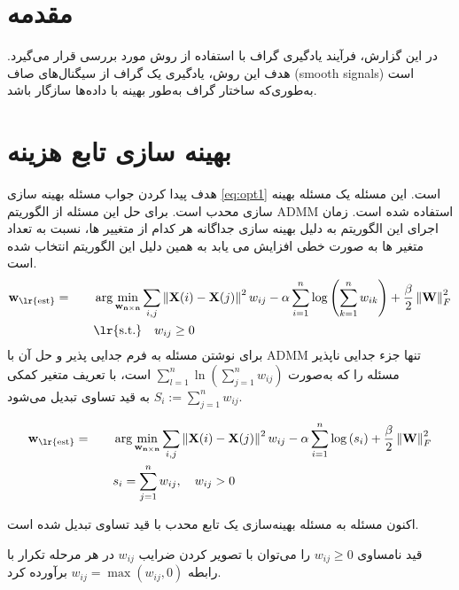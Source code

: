 \documentclass[12pt,onecolumn,a4paper]{article}
\begin{document}
	\section{مقدمه}
	در این گزارش، فرآیند یادگیری گراف با استفاده از روش \cite{Kalofolias2016} مورد بررسی قرار می‌گیرد. هدف این روش، یادگیری یک گراف از سیگنال‌های صاف (smooth signals) است به‌طوری‌که ساختار گراف به‌طور بهینه با داده‌ها سازگار باشد.
	\section{بهینه سازی تابع هزینه}
	هدف پیدا کردن جواب مسئله بهینه سازی
	\ref{eq:opt1}
	است. این مسئله یک مسئله بهینه سازی محدب است. برای حل این مسئله از الگوریتم ADMM استفاده شده است. زمان اجرای این الگوریتم به دلیل بهینه سازی جداگانه هر کدام از متغییر ها، نسبت به تعداد متغیر ها به صورت خطی افزایش می یابد به همین دلیل این الگوریتم انتخاب شده است. 
	\begin{equation}\label{eq:opt1}
		\begin{aligned}
		& \mathbf{w_{\text{\lr{est}}}} = &\quad &\arg \min_{\mathbf{w_{n \times n}}}\sum_{i,j} \left\| \mathbf{X}(i) - \mathbf{X}(j) \right\|^2 w_{ij} - \alpha \sum_{i=1}^{n} \log \left( \sum_{k=1}^{n} w_{ik} \right) + \frac{\beta}{2} \left\| \mathbf{W} \right\|_F^2 \\
		& &\quad & \text{\lr{s.t.}} \quad w_{ij} \geq 0 
		\end{aligned}
	\end{equation}
	برای نوشتن مسئله به فرم جدایی پذیر و حل آن با ADMM تنها جزء جدایی ناپذیر 
	مسئله را که به‌صورت 
	$
	\sum_{l=1}^{n} \ln \left( \sum_{j=1}^{n} w_{ij} \right)
	$
است، با تعریف متغیر کمکی 	$S_i := \sum_{j=1}^{n} w_{ij}$	به قید تساوی تبدیل می‌شود.

	\begin{equation}\label{eq:opt2}
		\begin{aligned}
			& \mathbf{w_{\text{\lr{est}}}} = &\quad &\arg \min_{\mathbf{w_{n \times n}}}\sum_{i,j} \left\| \mathbf{X}(i) - \mathbf{X}(j) \right\|^2 w_{ij} 
			- \alpha \sum_{i=1}^{n} \log \left( s_i \right) + \frac{\beta}{2} \left\| \mathbf{W} \right\|_F^2 \\
			& &\quad & s_i = \sum_{j=1}^{n} w_{ij}, \quad w_{ij} > 0
		\end{aligned}
	\end{equation}
	
	اکنون مسئله به مسئله بهینه‌سازی یک تابع محدب با قید تساوی تبدیل شده است.
	
 	قید نامساوی $w_{ij} \geq 0$ را می‌توان با تصویر کردن ضرایب \( w_{ij} \) 
	در هر مرحله تکرار با رابطه $w_{ij} = \max(w_{ij}, 0)$ برآورده کرد.
	
\end{document}
